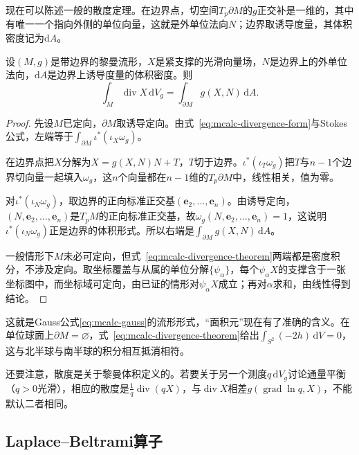 现在可以陈述一般的散度定理。在边界点，切空间$T_p\partial M$的$g$正交补是一维的，其中有唯一一个指向外侧的单位向量，这就是外单位法向$N$；边界取诱导度量，其体积密度记为$\mathrm dA$。

\begin{theorem}[散度定理]
\label{thm:mcalc-divergence-theorem}
设$(M,g)$是带边界的黎曼流形，$X$是紧支撑的光滑向量场，$N$是边界上的外单位法向，$\mathrm dA$是边界上诱导度量的体积密度。则
\begin{equation}
\int_M\operatorname{div}X\,\mathrm dV_g=\int_{\partial M}g(X,N)\,\mathrm dA .
\label{eq:mcalc-divergence-theorem}
\end{equation}
\end{theorem}

\begin{proof}
先设$M$已定向，$\partial M$取诱导定向。由式~\eqref{eq:mcalc-divergence-form}与Stokes公式，左端等于$\int_{\partial M}\iota^*(\iota_X\omega_g)$。

在边界点把$X$分解为$X=g(X,N)N+T$，$T$切于边界。$\iota^*(\iota_T\omega_g)$把$T$与$n-1$个边界切向量一起填入$\omega_g$，这$n$个向量都在$n-1$维的$T_p\partial M$中，线性相关，值为零。

对$\iota^*(\iota_N\omega_g)$，取边界的正向标准正交基$(\bm e_2,\ldots,\bm e_n)$。由诱导定向，$(N,\bm e_2,\ldots,\bm e_n)$是$T_pM$的正向标准正交基，故$\omega_g(N,\bm e_2,\ldots,\bm e_n)=1$，这说明$\iota^*(\iota_N\omega_g)$正是边界的体积形式。所以右端是$\int_{\partial M}g(X,N)\,\mathrm dA$。

一般情形下$M$未必可定向，但式~\eqref{eq:mcalc-divergence-theorem}两端都是密度积分，不涉及定向。取坐标覆盖与从属的单位分解$\{\psi_\alpha\}$，每个$\psi_\alpha X$的支撑含于一张坐标图中，而坐标域可定向，由已证的情形对$\psi_\alpha X$成立；再对$\alpha$求和，由线性得到结论。
\end{proof}

这就是Gauss公式\eqref{eq:mcalc-gauss}的流形形式，“面积元”现在有了准确的含义。在单位球面上$\partial M=\varnothing$，式~\eqref{eq:mcalc-divergence-theorem}给出$\int_{S^2}(-2h)\,\mathrm dV=0$，这与北半球与南半球的积分相互抵消相符。

还要注意，散度是关于黎曼体积定义的。若要关于另一个测度$q\,\mathrm dV_g$讨论通量平衡（$q>0$光滑），相应的散度是$\frac1q\operatorname{div}(qX)$，与$\operatorname{div}X$相差$g(\operatorname{grad}\ln q,X)$，不能默认二者相同。

\subsection{Laplace--Beltrami算子}
\label{sec:mcalc-laplace-beltrami}

